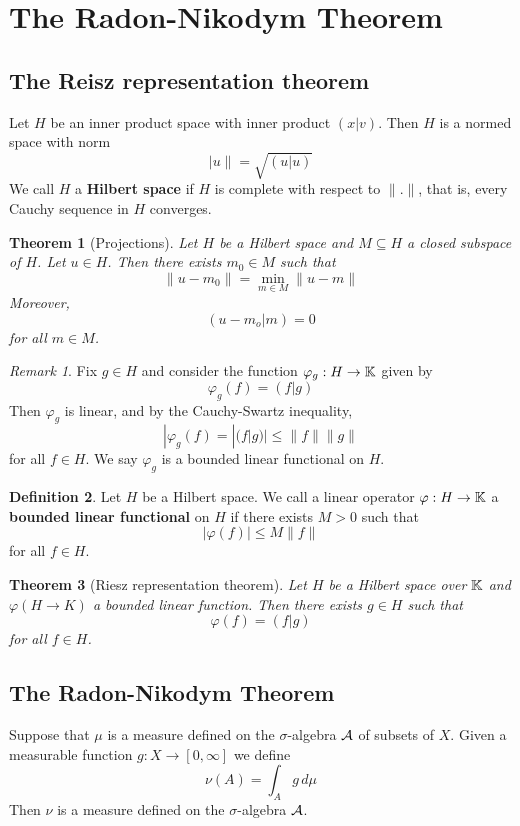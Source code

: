 \documentclass[10pt, oneside, reqno]{amsart}
\theoremstyle{plain}%
\newtheorem{thm}{Theorem}[section]
\theoremstyle{definition}
\newtheorem{defn}[thm]{Definition}
\theoremstyle{remark}
\newtheorem*{rem}{Remark}
\newcommand{\dmu}{\, d \mu}
\renewcommand{\phi}{\varphi}
\begin{document}
\section{The Radon-Nikodym Theorem} %
\label{sec:the_radon_nikodym_theorem}

\subsection{The Reisz representation theorem} %
\label{sub:the_reisz_representation_theorem}


Let $H$ be an inner product space with inner product $(x|v)$.  Then $H$ is a normed space with norm \[
	|u \| = \sqrt{(u | u)}
\]
We call $H$ a \textbf{Hilbert space} if $H$ is complete with respect to $\| . \|$, that is, every Cauchy sequence in $H$ converges. 


\begin{thm}[Projections]
	Let $H$ be a Hilbert space and $M \subseteq H$ a closed subspace of $H$.  Let $u \in H$.  Then there exists $m_0 \in M$ such that \[
		\| u - m_0 \| = \min_{m \in M} \| u - m \|
	\]
	Moreover, \[
		(u - m_o | m) = 0
	\] for all $m \in M$.
\end{thm}

\begin{rem}
	Fix $g \in H$ and consider the function $\phi_g : H \rightarrow \K$ given by \[
		\phi_g(f) = (f | g)
	\] 
	Then $\phi_g$ is linear, and by the Cauchy-Swartz inequality, \[
		| \phi_g(f) = |(f | g) | \leq \|f \| \|g \|
	\] for all $f \in H$.  We say $\phi_g$ is a bounded linear functional on $H$. 
\end{rem}

\begin{defn}
	Let $H$ be a Hilbert space.  We call a linear operator $\phi: H \rightarrow \K$ a \textbf{bounded linear functional} on $H$ if there exists $M > 0$ such that \[
		| \phi(f) | \leq M \| f \|
	\] for all $f \in H$.
\end{defn}

\begin{thm}[Riesz representation theorem]
	Let $H$ be a Hilbert space over $\mathbb{K}$ and $\phi(H \rightarrow K)$ a bounded linear function.  Then there exists $g \in H$ such that \[
		\phi(f) = (f | g)
	\] for all $f \in H$.
\end{thm}

\subsection{The Radon-Nikodym Theorem} %
\label{sub:the_radon_nikodym_theorem}
 Suppose that $\mu$ is a measure defined on the $\sigma$-algebra $\mathcal{A}$ of subsets of $X.$  Given a measurable function $g : X \rightarrow [0,\infty]$ we define \[
 	\nu(A) = \int_A g \dmu
 \]
Then $\nu$ is a measure defined on the $\sigma$-algebra $\mathcal{A}$.
\end{document}

